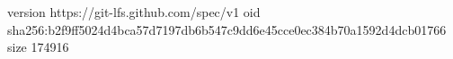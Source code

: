 version https://git-lfs.github.com/spec/v1
oid sha256:b2f9ff5024d4bca57d7197db6b547c9dd6e45cce0ec384b70a1592d4dcb01766
size 174916
